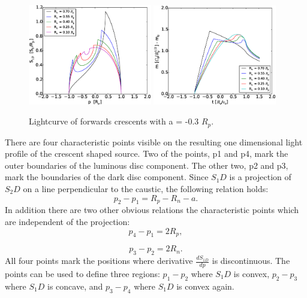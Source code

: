 \begin{figure}
\centering
	\includegraphics[width = 0.48\textwidth]{plots/S1D_var_rn_a_neg.eps}
	\includegraphics[width = 0.48\textwidth]{plots/5Rn_forw_var_magnification.eps}
\caption{\label{fig:lightcurve_crescent} Lightcurve of forwards crescents with a = -0.3 $R_p$.}
\end{figure}

There are four characteristic points visible on the resulting one dimensional light profile of the crescent shaped source. Two of the points, p1 and p4, mark the outer boundaries of the luminous disc component. The other two, p2 and p3, mark the boundaries of the dark disc component. Since $S_1D$ is a projection of $S_2D$ on a line perpendicular to the caustic, the following relation holds:
\begin{equation}
	p_2-p_1 = R_p -R_n - a.
\end{equation}
In addition there are two other obvious relations the characteristic points which are independent of the projection:
\begin{equation}
	p_4 -p_1 = 2 R_p,
\end{equation}

\begin{equation}
        p_3 -p_2 = 2 R_n.
\end{equation}
All four points mark the positions where derivative $\frac{dS_{1D}}{dp}$ is discontinuous. The points can be used to define three regions: $p_1 - p_2$ where $S_1D$ is convex, $p_2 - p_3$ where $S_1D$ is concave, and $p_3 - p_4$ where $S_1D$ is convex again. \\

